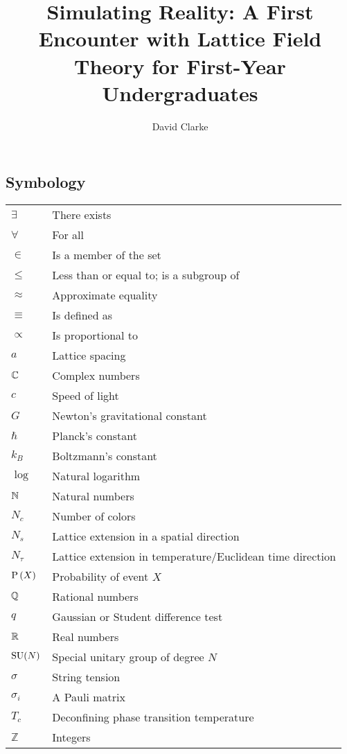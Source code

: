 \documentclass[12pt]{book}
\title{\bf Simulating Reality: A First Encounter with
Lattice Field Theory for First-Year Undergraduates}
\author{David Clarke}
\theoremstyle{definition}
\newenvironment{frontstuff}
  {\centering\chapter*{}}
  {\clearpage}
\begin{document}
\frontmatter                            %
\maketitle                              %


\begin{frontstuff} %

\section*{Symbology}
\begin{tabular}{ll}
$\exists$       & There exists \\
$\forall$       & For all \\
$\in$           & Is a member of the set \\
$\leq$          & Less than or equal to; is a subgroup of\\
$\approx$       & Approximate equality \\
$\equiv$        & Is defined as \\
$\propto$       & Is proportional to \\

$a$             & Lattice spacing \\
$\mathbb{C}$            & Complex numbers \\
$c$             & Speed of light\\
$G$             & Newton's gravitational constant\\
$\hbar$         & Planck's constant \\
$k_B$           & Boltzmann's constant \\
$\log$          & Natural logarithm \\
$\mathbb{N}$            & Natural numbers \\
$N_c$           & Number of colors \\
$N_s$           & Lattice extension in a spatial direction \\
$N_\tau$        & Lattice extension in temperature/Euclidean time direction\\
$\operatorname{P}\left(X\right)$        & Probability of event $X$ \\
$\mathbb{Q}$            & Rational numbers \\
$q$             & Gaussian or Student difference test \\
$\mathbb{R}$            & Real numbers \\
$\operatorname{SU}(N)$        & Special unitary group of degree $N$ \\
$\sigma$        & String tension\\
$\sigma_i$      & A Pauli matrix\\
$T_c$           & Deconfining phase transition temperature\\
$\mathbb{Z}$    & Integers \\



\end{tabular}
\end{frontstuff}
\end{document}
